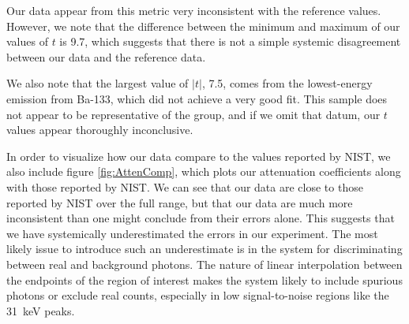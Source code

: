 \documentclass[letter]{article}
\begin{document}

Our data appear from this metric very inconsistent with the reference values. However, we note that the difference between the minimum and maximum of our values of $t$ is 9.7, which suggests that there is not a simple systemic disagreement between our data and the reference data.

We also note that the largest value of $|t|$, 7.5, comes from the lowest-energy emission from Ba-133, which did not achieve a very good fit. This sample does not appear to be representative of the group, and if we omit that datum, our $t$ values appear thoroughly inconclusive.

In order to visualize how our data compare to the values reported by NIST, we also include figure \ref{fig:AttenComp}, which plots our attenuation coefficients along with those reported by NIST. We can see that our data are close to those reported by NIST over the full range, but that our data are much more inconsistent than one might conclude from their errors alone. This suggests that we have systemically underestimated the errors in our experiment. The most likely issue to introduce such an underestimate is in the system for discriminating between real and background photons. The nature of linear interpolation between the endpoints of the region of interest makes the system likely to include spurious photons or exclude real counts, especially in low signal-to-noise regions like the \qty{31}{\kilo\electronvolt} peaks.
\end{document}
